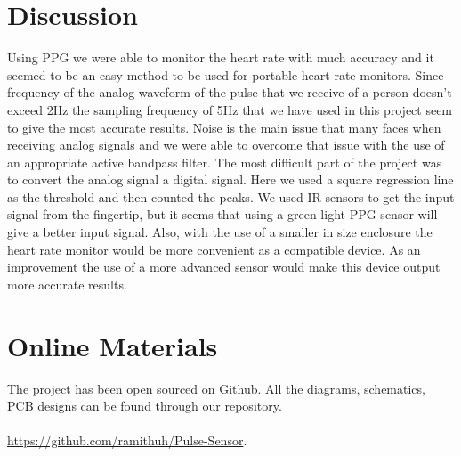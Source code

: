 \documentclass[12pt]{article}
\begin{document}
\section{Discussion}
Using PPG we were able to monitor the heart rate with much accuracy and it seemed to be an easy method to be used for portable heart rate monitors. Since frequency of the analog waveform of the pulse that we receive of a person doesn’t exceed 2Hz the sampling frequency of 5Hz that we have used in this project seem to give the most accurate results. 
Noise is the main issue that many faces when receiving analog signals and we were able to overcome that issue with the use of an appropriate active bandpass filter. The most difficult part of the project was to convert the analog signal a digital signal. Here we used a square regression line as the threshold and then counted the peaks. 
We used IR sensors to get the input signal from the fingertip, but it seems that using a green light PPG sensor will give a better input signal. Also, with the use of a smaller in size enclosure the heart rate monitor would be more convenient as a compatible device.
As an improvement the use of a more advanced sensor would make this device output more accurate results.


\newpage
\section{Online Materials}
The project has been open sourced on Github. All the diagrams, schematics, PCB designs can be found through our repository.\\\\
\faGithub\href{https://github.com/ramithuh/Pulse-Sensor}{ https://github.com/ramithuh/Pulse-Sensor}.

 
\newpage


{}

\end{document}

